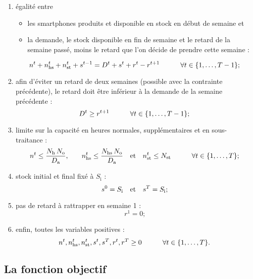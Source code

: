 \begin{enumerate}
    \item égalité entre
    \begin{itemize}
        \item les smartphones produits et disponible en stock en début de semaine et
        \item la demande, le stock disponible en fin de semaine et le retard de la semaine passé, moins le retard que l'on décide de prendre cette semaine :
    \end{itemize}
    
    \[
        n^t + n_\mathrm{hs}^t + n_\mathrm{st}^t + s^{t-1} = D^t + s^t + r^t - r^{t+1}
        \qquad\quad \forall t \in \{1,\dots,T-1\}
        \text;
    \]
    
    \item afin d'éviter un retard de deux semaines (possible avec la contrainte précédente), le retard doit être inférieur à la demande de la semaine précédente :
    \[
        D^t \geq r^{t+1}
        \qquad\quad \forall t \in \{1,\dots,T-1\}
        \text;
    \]
    
    \item limite sur la capacité en heures normales, supplémentaires et en sous-traitance :
    \[
        n^t \leq \frac{N_\mathrm{h}\,N_\mathrm{o}}{D_\mathrm{a}}
        \text,\qquad
        n_\mathrm{hs}^t \leq \frac{N_\mathrm{hs}\,N_\mathrm{o}}{D_\mathrm{a}}
        \quad\text{et}\quad
        n_\mathrm{st}^t \leq N_\mathrm{st}
        \qquad\quad \forall t \in \{1,\dots,T\}
        \text;
    \]
    
    \item stock initial et final fixé à $S_\mathrm{i}$ :
    \[
        s^0 = S_\mathrm{i} \quad\text{et}\quad s^T = S_\mathrm{i}
        \text;
    \]
    
    \item pas de retard à rattrapper en semaine 1 :
    \[
        r^1 = 0
        \text{;}
    \]
    
    \item enfin, toutes les variables positives :
    \[
        n^t, n_\mathrm{hs}^t, n_\mathrm{st}^t, s^t, s^T, r^t, r^T \geq 0
        \qquad\quad \forall t \in \{1,\dots,T\}
        \text.
    \]
\end{enumerate}

\subsection*{La fonction objectif}

